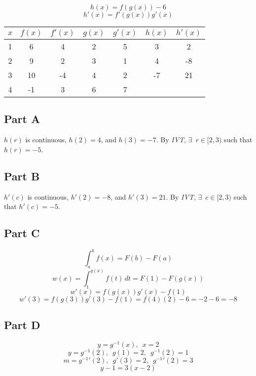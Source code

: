 \[ h(x) = f(g(x))-6 \]
\[ h'(x) = f'(g(x))g'(x) \]
\begin{center}
	\begin{tabular}{ | c || c | c | c | c | c | c | }
		\hline
		\rule{0pt}{4ex}
		$x$ & $f(x)$ & $f'(x)$ & $g(x)$ & $g'(x)$ & $h(x)$ & $h'(x)$ \\
		\hline
		\hline
		1 & 6  & 4  & 2 & 5 & 3  & 2 \\
		\hline
		2 & 9  & 2  & 3 & 1 & 4  & -8 \\
		\hline
		3 & 10 & -4 & 4 & 2 & -7 & 21 \\
		\hline
		4 & -1 & 3  & 6 & 7 & & \\
		\hline
	\end{tabular}
\end{center}

\subsection{Part A}
$h(r)$ is continuous, $h(2) = 4$, and $h(3) = -7$. By \textit{IVT}, $\exists \enspace r \in [2, 3)$ such that $h(r) = -5$.

\subsection{Part B}
$h'(c)$ is continuous, $h'(2) = -8$, and $h'(3) = 21$. By \textit{IVT}, $\exists \enspace c \in [2, 3)$ such that $h'(c) = -5$.

\subsection{Part C}
\[ \int_{a}^{b} f(x) = F(b) - F(a) \]
\[ w(x) = \int_{1}^{g(x)} f(t)\,dt = F(1) - F(g(x)) \]
\[ w'(x) = f(g(x))g'(x) - f(1) \]
\[ w'(3) = f(g(3))g'(3) - f(1) = f(4)(2) - 6 = -2 - 6 = -8 \]

\subsection{Part D}
\[ y = g^{-1}(x), \enspace x = 2 \]
\[ y = g^{-1}(2), \enspace g(1) = 2, \enspace g^{-1}(2) = 1 \]
\[ m = g^{-1}'(2), \enspace g'(3) = 2, \enspace g^{-1}'(2) = 3 \]
\[ y - 1 = 3(x - 2) \]
